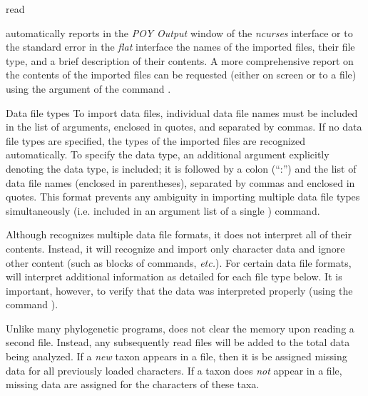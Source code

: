 \begin{command}{read}{}
\begin{poydescription}
\poy automatically reports in the \emph{POY Output} window of the \emph{ncurses}
interface or to the standard error in the \emph{flat} interface the names
of the imported files, their file type, and a brief description of
their contents. A more comprehensive report on the contents of the imported
files can be requested (either on screen or to a file) using the argument
 of the command .

\end{poydescription}

\begin{arguments}

\begin{argumentgroup}{Data file types}
To import data files, individual data file names must be included in
the list of  arguments, enclosed in quotes, and
separated by commas. If no data file types are specified, the types
of the imported files are recognized automatically. To specify the
data type, an additional argument explicitly denoting the data type,
is included; it is followed by a colon (``:'') and the list of data
file names (enclosed in parentheses), separated by commas and
enclosed in quotes. This format prevents any ambiguity in importing
multiple data file types simultaneously (i.e. included in an
argument list of a single ) command.

\end{argumentgroup}

\begin{statement}
Although \poy recognizes multiple data file formats, it does not
interpret all of their contents. Instead, it will recognize and import
only character data and ignore other content (such as blocks of
commands, \emph{etc.}). For certain data file formats, \poy will interpret
additional information as detailed for each file type below.
It is important, however, to verify that the data was interpreted properly (using
the command ).
\end{statement}

\begin{statement}
Unlike many phylogenetic programs, \poy does not clear the memory
upon reading a second file. Instead, any subsequently read files
will be added to the total data being analyzed. If a \emph{new} taxon
appears in a file, then it is be assigned missing data for all
previously loaded characters. If a taxon does \emph{not} appear in a
file, missing data are assigned for the characters of these taxa. 


\end{statement}
\end{arguments}
\end{command}
